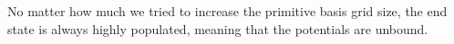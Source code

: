 \documentclass[letterpaper, 12pt, oneside]{report}
\newif\iffinalize
\newif\iffinalize
\begin{document}
No matter how much we tried to increase the primitive basis grid size, the end state is always highly populated, meaning that the potentials are unbound.


    


\newpage
\else \fi

\iffinalize \addcontentsline{toc}{chapter}{References / Bibliography} \chapter*{References / Bibliography} \newpage
\printbibliography
\else \fi
\end{document}
